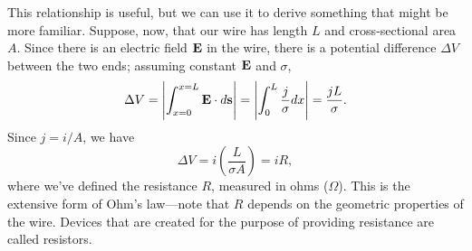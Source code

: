 \documentclass[../p051main.tex]{subfiles}
\begin{document}
This relationship is useful, but we can use it to derive something that might be more familiar.
Suppose, now, that our wire has length $L$ and cross-sectional area $A$.
Since there is an electric field $\mathbf{E}$ in the wire, there is a potential difference $\Delta V$ between the two ends; assuming constant $\mathbf{E}$ and $\sigma$,
\[ \Delta V = \left| \int_{x = 0}^{x = L} \mathbf{E} \cdot d\mathbf{s} \right| = \left| \int_{0}^{L} \frac{j}{\sigma} dx \right| = \frac{jL}{\sigma}. \]
Since $j = i / A$, we have
\[ \Delta V = i \left( \frac{L}{\sigma A} \right) = iR, \]
where we've defined the resistance $R$, measured in ohms ($\Omega$).
This is the extensive form of Ohm's law---note that $R$ depends on the geometric properties of the wire.
Devices that are created for the purpose of providing resistance are called resistors.
\end{document}

